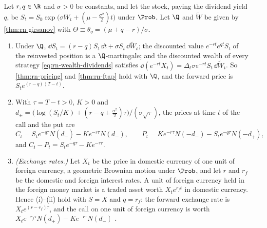 \begin{proposition}\label{prop:rn-dividends}
Let $r,q\in\R$ and $\sigma>0$ be constants, and let the stock, paying the dividend yield $q$,
be $S_t=S_0\exp\big(\sigma W_t+(\mu-\frac{\sigma^2}2)t\big)$ under $\Prob$. Let $\Q$ and
$\widetilde W$ be given by \cref{thm:rn-girsanov} with $\Theta\equiv\theta_q=(\mu+q-r)/\sigma$.
\begin{enumerate}[label=(\roman*)]
  \item Under $\Q$, $\dd S_t=(r-q)S_t\,\dd t+\sigma S_t\,\dd\widetilde W_t$; the discounted
    value $e^{-rt}e^{qt}S_t$ of the reinvested position is a $\Q$-martingale; and the
    discounted wealth of every strategy \eqref{eq:rn-wealth-dividends} satisfies
    $\dd(e^{-rt}X_t)=\Delta_t\sigma e^{-rt}S_t\,\dd\widetilde W_t$. So \cref{thm:rn-pricing} and
    \cref{thm:rn-ftap} hold with $\Q$, and the forward price is $S_te^{(r-q)(T-t)}$.
  \item With $\tau=T-t>0$, $K>0$ and
    $d_\pm=\big(\log(S_t/K)+(r-q\pm\frac{\sigma^2}{2})\tau\big)/(\sigma\sqrt\tau)$, the prices at
    time $t$ of the call and the put are
    \[
      C_t=S_te^{-q\tau}N(d_+)-Ke^{-r\tau}N(d_-),\qquad
      P_t=Ke^{-r\tau}N(-d_-)-S_te^{-q\tau}N(-d_+),
    \]
    and $C_t-P_t=S_te^{-q\tau}-Ke^{-r\tau}$.
  \item \emph{(Exchange rates.)} Let $X_t$ be the price in domestic currency of one unit of
    foreign currency, a geometric Brownian motion under $\Prob$, and let $r$ and $r_f$ be the
    domestic and foreign interest rates. A unit of foreign currency held in the foreign money
    market is a traded asset worth $X_te^{r_ft}$ in domestic currency. Hence (i)--(ii) hold
    with $S=X$ and $q=r_f$: the forward exchange rate is $X_te^{(r-r_f)\tau}$, and the call on
    one unit of foreign currency is worth $X_te^{-r_f\tau}N(d_+)-Ke^{-r\tau}N(d_-)$
    \citep{garman-kohlhagen-1983}.
\end{enumerate}
\end{proposition}

